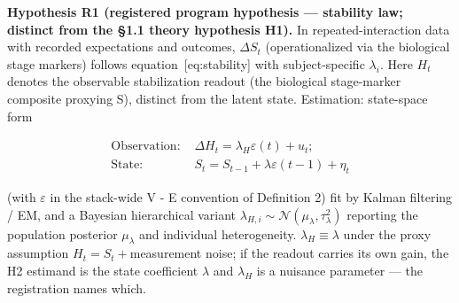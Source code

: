 \documentclass[
]{article}
\begin{document}
\textbf{Hypothesis R1 (registered program hypothesis --- stability law;
distinct from the §1.1 theory hypothesis H1).} In repeated-interaction
data with recorded expectations and outcomes, \(\Delta S_t\)
(operationalized via the biological stage markers) follows
equation~{[}eq:stability{]} with subject-specific \(\lambda_i.\) Here
\(H_t\) denotes the observable stabilization readout (the biological
stage-marker composite proxying S), distinct from the latent state.
Estimation: state-space form

\begin{equation}
\begin{split}
\text{Observation: } & \Delta H_t = \lambda_H \varepsilon(t) + u_t;\\ \text{State: } &S_t = S_{t-1} + \lambda \varepsilon(t-1) + \eta_t
\end{split}
\label{eq:statespace}
\end{equation}

(with \(\varepsilon\) in the stack-wide V - E convention of Definition
2) fit by Kalman filtering / EM, and a Bayesian hierarchical variant
\(\lambda_{H,i} \sim \mathcal{N}(\mu_\lambda, \tau_\lambda^{2})\)
reporting the population posterior \(\mu_\lambda\) and individual
heterogeneity. \(\lambda_H \equiv \lambda\) under the proxy assumption
\(H_t = S_t + {}\)measurement noise; if the readout carries its own
gain, the H2 estimand is the state coefficient \(\lambda\) and
\(\lambda_H\) is a nuisance parameter --- the registration names which.
\end{document}
